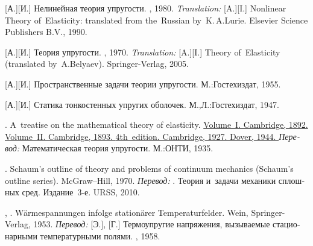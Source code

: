 \begin{thebibliography}{123}
\begin{otherlanguage}{russian}
[А.][И.] Нелинейная теория упругости. \naukapublisher, 1980. 
\emph{Translation:}
[A.][I.] Nonlinear Theory of~Elasticity: translated from the~Russian by~K.\,A.\;Lurie. Elsevier Science Publishers B.\hspace{.1ex}V\hspace{-0.2ex}., 1990. 

[А.][И.]
Теория упругости.
\naukapublisher, 1970.
\emph{Translation:}
[A.][I.]
Theory of~Elasticity (translated by~A.\:Belyaev).
Springer-Verlag, 2005.

[А.][И.]
Пространственные задачи теории упругости.
М.:\;Гос\-тех\-издат, 1955.

[А.][И.]
Статика тонкостенных упругих оболочек.
М.,\:Л.:\;Гос\-тех\-издат, 1947.

.
A~treatise on the mathematical theory of elasticity.
\href{https://hal.archives-ouvertes.fr/hal-01307751/document}{
Volume~I.
Cambridge, 1892.
}
\href{https://archive.org/details/in.ernet.dli.2015.503659}{
Volume~II.
Cambridge, 1893.
}
\href{https://archive.org/details/in.ernet.dli.2015.462644/page/n1}{
4th~edition.
Cambridge, 1927.
Dover, 1944.
}
\emph{Перевод:}
Математическая теория упругости.
М.:\;ОНТИ,
1935.

.
Schaum’s outline of theory and problems of continuum mechanics
(Schaum’s outline series).
McGraw\hbox{--}Hill,
1970.
\emph{Перевод:}
.
Теория и~задачи механики сплошных сред.
Издание~3\hbox{-}е.
URSS, 2010.

, . Wärmespannungen infolge stationärer Temperaturfelder. Wein, Springer-Verlag, 1953. 
\emph{Перевод:} [Э.], [Г.] Термоупругие напряжения, вызываемые стационарными температурными полями. \fizmatgiz, 1958. 


\end{otherlanguage}
\end{thebibliography}
